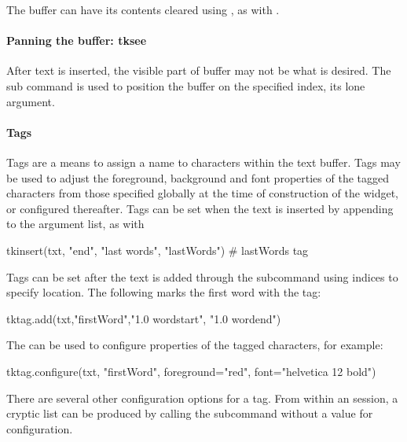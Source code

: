 The buffer can have its contents cleared using , as
with .

\paragraph{Panning the buffer: tksee}
After text is inserted, the visible part of buffer may not be what is
desired. The  sub command is used to position
the buffer on the specified index, its lone argument.


\paragraph{Tags}
Tags are a means to assign a name to characters within the text
buffer. Tags may be used to adjust the foreground, background and font
properties of the tagged characters from those specified globally at
the time of construction of the widget, or configured thereafter. Tags
can be set when the text is inserted by appending to the argument
list, as with
\begin{Schunk}
\begin{Sinput}
 tkinsert(txt, "end", "last words", "lastWords") # lastWords tag
\end{Sinput}
\end{Schunk}

Tags can be set after the text is added through the
 subcommand using indices to specify
location. The following marks the first word with the 
tag:
\begin{Schunk}
\begin{Sinput}
 tktag.add(txt,"firstWord","1.0 wordstart", "1.0 wordend")
\end{Sinput}
\end{Schunk}
The  can be used to configure properties of the tagged characters, for example:
\begin{Schunk}
\begin{Sinput}
 tktag.configure(txt, "firstWord", foreground="red", 
                 font="helvetica 12 bold")
\end{Sinput}
\end{Schunk}
%
There are several other configuration options for a tag. From within
an \R\/ session, a cryptic list can be produced by calling the
subcommand  without a value for
configuration.


